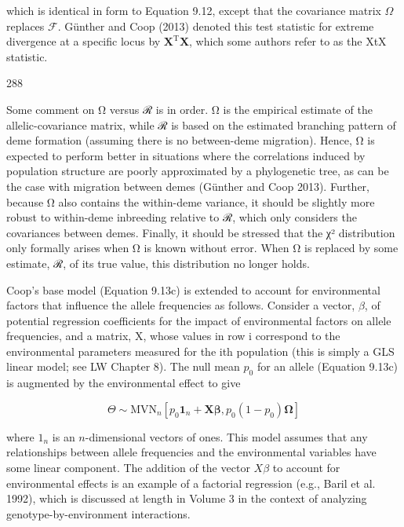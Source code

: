 \documentclass{article}
\begin{document}
which is identical in form to Equation 9.12, except that the covariance matrix  $ \Omega $ replaces  $ \mathcal{F} $. Günther and Coop (2013) denoted this test statistic for extreme divergence at a specific locus by  $ \mathbf{X}^{\mathrm{T}}\mathbf{X} $, which some authors refer to as the XtX statistic.

288

Some comment on Ω versus ℛ is in order. Ω is the empirical estimate of the allelic-covariance matrix, while ℛ is based on the estimated branching pattern of deme formation (assuming there is no between-deme migration). Hence, Ω is expected to perform better in situations where the correlations induced by population structure are poorly approximated by a phylogenetic tree, as can be the case with migration between demes (Günther and Coop 2013). Further, because Ω also contains the within-deme variance, it should be slightly more robust to within-deme inbreeding relative to ℛ, which only considers the covariances between demes. Finally, it should be stressed that the χ² distribution only formally arises when Ω is known without error. When Ω is replaced by some estimate, ℛ, of its true value, this distribution no longer holds.

Coop's base model (Equation 9.13c) is extended to account for environmental factors that influence the allele frequencies as follows. Consider a vector,  $ \beta $, of potential regression coefficients for the impact of environmental factors on allele frequencies, and a matrix, X, whose values in row i correspond to the environmental parameters measured for the ith population (this is simply a GLS linear model; see LW Chapter 8). The null mean  $ p_0 $ for an allele (Equation 9.13c) is augmented by the environmental effect to give

\begin{equation}
\Theta\sim\mathrm{MVN}_{n}\left[p_{0}\mathbf{1}_{n}+\mathbf{X}\boldsymbol{\beta},p_{0}(1-p_{0})\boldsymbol{\Omega}\right]
\tag{9.13d}
\label{eq:9_13d}
\end{equation}

where  $ 1_n $ is an  $ n $-dimensional vectors of ones. This model assumes that any relationships between allele frequencies and the environmental variables have some linear component. The addition of the vector  $ X\beta $ to account for environmental effects is an example of a factorial regression (e.g., Baril et al. 1992), which is discussed at length in Volume 3 in the context of analyzing genotype-by-environment interactions.
\end{document}

